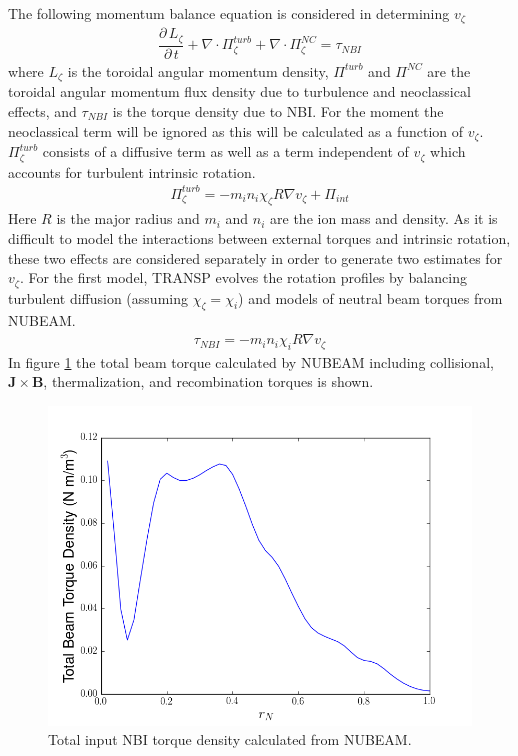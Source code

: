 \documentclass{article}
\newcommand{\partder}[2]{\dfrac{\partial \, #1}{\partial \, #2}} %
\begin{document}
The following momentum balance equation is considered in determining $v_{\zeta}$
\begin{gather}
\partder{L_{\zeta}}{t} + \nabla \cdot \Pi_{\zeta}^{turb} + \nabla \cdot \Pi_{\zeta}^{NC} = \tau_{NBI}
\end{gather}
where $L_{\zeta}$ is the toroidal angular momentum density, $\Pi^{turb}$ and $\Pi^{NC}$ are the toroidal angular momentum flux density due to turbulence and neoclassical effects, and $\tau_{NBI}$ is the torque density due to NBI. For the moment the neoclassical term will be ignored as this will be calculated as a function of $v_{\zeta}$. $\Pi_{\zeta}^{turb}$ consists of a diffusive term as well as a term independent of $v_{\zeta}$ which accounts for turbulent intrinsic rotation.
\begin{gather}
\Pi_{\zeta}^{turb} = -m_i n_i \chi_{\zeta} R \nabla v_{\zeta} + \Pi_{int}
\end{gather}
Here $R$ is the major radius and $m_i$ and $n_i$ are the ion mass and density. As it is difficult to model the interactions between external torques and intrinsic rotation, these two effects are considered separately in order to generate two estimates for $v_{\zeta}$. For the first model, TRANSP evolves the rotation profiles by balancing turbulent diffusion (assuming $\chi_{\zeta} = \chi_{i}$) and models of neutral beam torques from NUBEAM. 
\begin{gather}
\tau_{NBI} = -m_i n_i \chi_{i} R \nabla v_{\zeta}
\end{gather}
In figure \ref{fig:beamtorque} the total beam torque calculated by NUBEAM including collisional, $\bm{J} \times \bm{B}$, thermalization, and recombination torques \cite{Poli2014} is shown.

\begin{figure}[h!]
\centering
\includegraphics[width=1\textwidth]
{beamtorque.png}
\caption{\label{fig:beamtorque} Total input NBI torque density calculated from NUBEAM.}
\end{figure}
\end{document}
